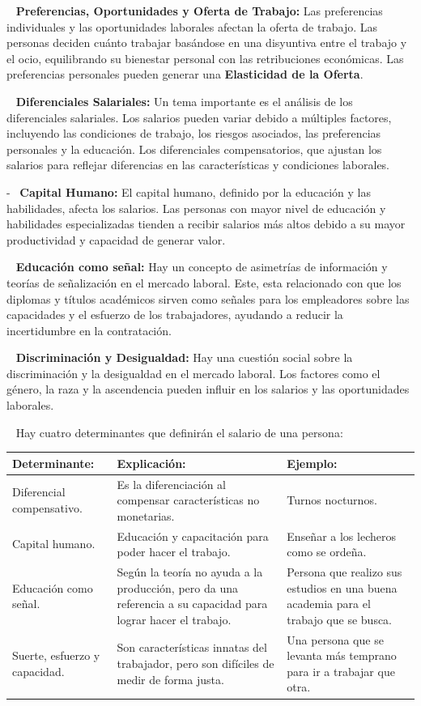 \documentclass[
  letterpaper,
  DIV=11,
  numbers=noendperiod]{scrreport}
\begin{document}
~ \textbf{Preferencias, Oportunidades y Oferta de Trabajo:} Las
preferencias individuales y las oportunidades laborales afectan la
oferta de trabajo. Las personas deciden cuánto trabajar basándose en una
disyuntiva entre el trabajo y el ocio, equilibrando su bienestar
personal con las retribuciones económicas. Las preferencias personales
pueden generar una \textbf{Elasticidad de la Oferta}.

~ \textbf{Diferenciales Salariales:} Un tema importante es el análisis
de los diferenciales salariales. Los salarios pueden variar debido a
múltiples factores, incluyendo las condiciones de trabajo, los riesgos
asociados, las preferencias personales y la educación. Los diferenciales
compensatorios, que ajustan los salarios para reflejar diferencias en
las características y condiciones laborales.

-~ \textbf{Capital Humano:} El capital humano, definido por la educación
y las habilidades, afecta los salarios. Las personas con mayor nivel de
educación y habilidades especializadas tienden a recibir salarios más
altos debido a su mayor productividad y capacidad de generar valor.

~ \textbf{Educación como señal:} Hay un concepto de asimetrías de
información y teorías de señalización en el mercado laboral. Este, esta
relacionado con que los diplomas y títulos académicos sirven como
señales para los empleadores sobre las capacidades y el esfuerzo de los
trabajadores, ayudando a reducir la incertidumbre en la contratación.

~ \textbf{Discriminación y Desigualdad:} Hay una cuestión social sobre
la discriminación y la desigualdad en el mercado laboral. Los factores
como el género, la raza y la ascendencia pueden influir en los salarios
y las oportunidades laborales.

~ Hay cuatro determinantes que definirán el salario de una persona:

\begin{table}[h]
    \centering
    \begin{tabular}{|p{40mm}|p{40mm}|p{40mm}|}
        \hline
        Determinante: & Explicación: & Ejemplo: \\ \hline
    Diferencial compensativo. & Es la diferenciación al compensar características no monetarias. & Turnos nocturnos. \\ \hline
    Capital humano. & Educación y capacitación para poder hacer el trabajo. & Enseñar a los lecheros como se ordeña. \\ \hline
    Educación como señal. & Según la teoría no ayuda a la producción, pero da una referencia a su capacidad para lograr hacer el trabajo. & Persona que realizo sus estudios en una buena academia para el trabajo que se busca. \\ \hline
    Suerte, esfuerzo y capacidad. & Son características innatas del trabajador, pero son difíciles de medir de forma justa. & Una persona que se levanta más temprano para ir a trabajar que otra. \\ \hline
    \end{tabular}
    
\end{table}
\end{document}
